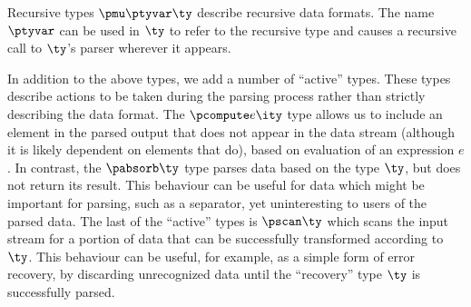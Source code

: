 Recursive types $\pmu \ptyvar \ty$ describe recursive data formats.
The name $\ptyvar$ can be used in $\ty$ to refer to the recursive type
and causes a recursive call to $\ty$'s parser wherever it appears.

In addition to the above types, we add a number of ``active'' types.
These types describe actions to be taken during the parsing process
rather than strictly describing the data format. The $\pcompute e
\ity$ type allows us to include an element in the parsed output that
does not appear in the data stream (although it is likely dependent on
elements that do), based on evaluation of an expression $e$.  In
contrast, the $\pabsorb \ty$ type parses data based on the type $\ty$,
but does not return its result. This behaviour can be useful for data
which might be important for parsing, such as a separator, yet
uninteresting to users of the parsed data. The last of the ``active''
types is $\pscan \ty$ which scans the input stream for a portion of
data that can be successfully transformed according to $\ty$. This
behaviour can be useful, for example, as a simple form of error
recovery, by discarding unrecognized data until the ``recovery'' type
$\ty$ is successfully parsed.

